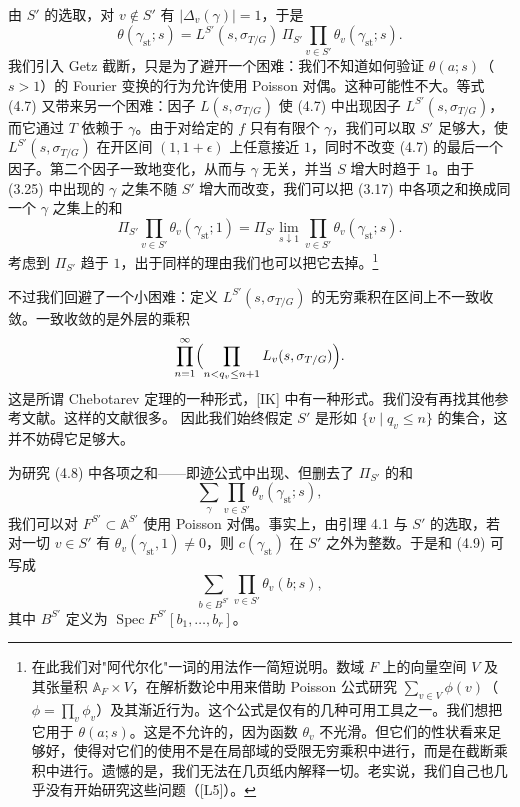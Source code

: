 由 $S'$ 的选取，对 $v\notin S'$ 有 $|\Delta_v(\gamma)|=1$，于是
\begin{equation}\tag{4.7}
\theta(\gamma_{\mathrm{st}};s)
=L^{S'}(s,\sigma_{T/G})\,\Pi_{S'}\prod_{v\in S'}\theta_v(\gamma_{\mathrm{st}};s).
\end{equation}
我们引入 Getz 截断，只是为了避开一个困难：我们不知道如何验证 $\theta(a;s)$（$s>1$）的 Fourier 变换的行为允许使用 Poisson 对偶。这种可能性不大。等式 (4.7) 又带来另一个困难：因子 $L(s,\sigma_{T/G})$ 使 (4.7) 中出现因子 $L^{S'}(s,\sigma_{T/G})$，而它通过 $T$ 依赖于 $\gamma$。由于对给定的 $f$ 只有有限个 $\gamma$，我们可以取 $S'$ 足够大，使 $L^{S'}(s,\sigma_{T/G})$ 在开区间 $(1,1+\epsilon)$ 上任意接近 $1$，同时不改变 (4.7) 的最后一个因子。第二个因子一致地变化，从而与 $\gamma$ 无关，并当 $S$ 增大时趋于 $1$。由于 (3.25) 中出现的 $\gamma$ 之集不随 $S'$ 增大而改变，我们可以把 (3.17) 中各项之和换成同一个 $\gamma$ 之集上的和
\begin{equation}\tag{4.8}
\Pi_{S'}\prod_{v\in S'}\theta_v(\gamma_{\mathrm{st}};1)
=\Pi_{S'}\lim_{s\downarrow1}\prod_{v\in S'}\theta_v(\gamma_{\mathrm{st}};s).
\end{equation}
考虑到 $\Pi_{S'}$ 趋于 $1$，出于同样的理由我们也可以把它去掉。\footnote{在此我们对"阿代尔化"一词的用法作一简短说明。数域 $F$ 上的向量空间 $V$ 及其张量积 $\mathbb A_F\times V$，在解析数论中用来借助 Poisson 公式研究 $\sum_{v\in V}\phi(v)$（$\phi=\prod_v\phi_v$）及其渐近行为。这个公式是仅有的几种可用工具之一。我们想把它用于 $\theta(a;s)$。这是不允许的，因为函数 $\theta_v$ 不光滑。但它们的性状看来足够好，使得对它们的使用不是在局部域的受限无穷乘积中进行，而是在截断乘积中进行。遗憾的是，我们无法在几页纸内解释一切。老实说，我们自己也几乎没有开始研究这些问题（[L5]）。}

不过我们回避了一个小困难：定义 $L^{S'}(s,\sigma_{T/G})$ 的无穷乘积在区间上不一致收敛。一致收敛的是外层的乘积
\[
\prod_{n=1}^\infty\Bigl(\prod_{n<q_v\le n+1}L_v(s,\sigma_{T/G})\Bigr).
\]
这是所谓 Chebotarev 定理的一种形式，[IK] 中有一种形式。我们没有再找其他参考文献。这样的文献很多。
因此我们始终假定 $S'$ 是形如 $\{v\mid q_v\le n\}$ 的集合，这并不妨碍它足够大。

为研究 (4.8) 中各项之和——即迹公式中出现、但删去了 $\Pi_{S'}$ 的和
\begin{equation}\tag{4.9}
\sum_\gamma\prod_{v\in S'}\theta_v(\gamma_{\mathrm{st}};s),
\end{equation}
我们可以对 $F^{S'}\subset\mathbb A^{S'}$ 使用 Poisson 对偶。事实上，由引理 4.1 与 $S'$ 的选取，若对一切 $v\in S'$ 有 $\theta_v(\gamma_{\mathrm{st}},1)\ne0$，则 $c(\gamma_{\mathrm{st}})$ 在 $S'$ 之外为整数。于是和 (4.9) 可写成
\begin{equation}\tag{4.10}
\sum_{b\in B^{S'}}\prod_{v\in S'}\theta_v(b;s),
\end{equation}
其中 $B^{S'}$ 定义为 $\operatorname{Spec}F^{S'}[b_1,\dots,b_r]$。

